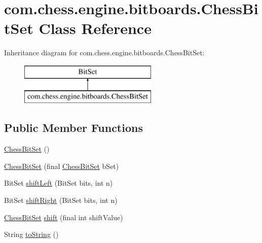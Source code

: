 \hypertarget{classcom_1_1chess_1_1engine_1_1bitboards_1_1_chess_bit_set}{}\section{com.\+chess.\+engine.\+bitboards.\+Chess\+Bit\+Set Class Reference}
\label{classcom_1_1chess_1_1engine_1_1bitboards_1_1_chess_bit_set}
Inheritance diagram for com.\+chess.\+engine.\+bitboards.\+Chess\+Bit\+Set\+:\begin{figure}[H]
\begin{center}
\leavevmode
\includegraphics[height=2.000000cm]{classcom_1_1chess_1_1engine_1_1bitboards_1_1_chess_bit_set}
\end{center}
\end{figure}
\subsection*{Public Member Functions}
\begin{DoxyCompactItemize}
\item 
\mbox{\hyperlink{classcom_1_1chess_1_1engine_1_1bitboards_1_1_chess_bit_set_a06668e12fbe9dc4cc6d5a5a71864ff1f}{Chess\+Bit\+Set}} ()
\item 
\mbox{\hyperlink{classcom_1_1chess_1_1engine_1_1bitboards_1_1_chess_bit_set_abfe79c1da2c69f38690c4dfbc14e1818}{Chess\+Bit\+Set}} (final \mbox{\hyperlink{classcom_1_1chess_1_1engine_1_1bitboards_1_1_chess_bit_set}{Chess\+Bit\+Set}} b\+Set)
\item 
Bit\+Set \mbox{\hyperlink{classcom_1_1chess_1_1engine_1_1bitboards_1_1_chess_bit_set_a7013eef007c2437dfcbc0cefdc65e3be}{shift\+Left}} (Bit\+Set bits, int n)
\item 
Bit\+Set \mbox{\hyperlink{classcom_1_1chess_1_1engine_1_1bitboards_1_1_chess_bit_set_afdbabd7fc6842544b139774471568c74}{shift\+Right}} (Bit\+Set bits, int n)
\item 
\mbox{\hyperlink{classcom_1_1chess_1_1engine_1_1bitboards_1_1_chess_bit_set}{Chess\+Bit\+Set}} \mbox{\hyperlink{classcom_1_1chess_1_1engine_1_1bitboards_1_1_chess_bit_set_a893656939193a9a665922bf8673ecd3d}{shift}} (final int shift\+Value)
\item 
String \mbox{\hyperlink{classcom_1_1chess_1_1engine_1_1bitboards_1_1_chess_bit_set_abd20d2df1988da73fed7b26b0e9ebb10}{to\+String}} ()
\end{DoxyCompactItemize}


